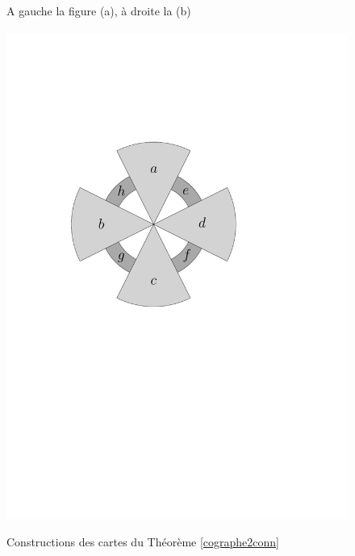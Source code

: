 \documentclass{scrartcl}
\begin{document}
\begin{flushleft}
\begin{figure}[h]
    \caption{Constructions des cartes du Théorème \ref{cographe2conn}}\label{cographemap}
    \begin{center}
        A gauche la figure (a), à droite la (b)
        \\~\\
        \includegraphics[page = \ipeFigpointabuse, scale = 0.4]{figs}
        \hspace*{1.5cm}

\end{center}
\end{figure}
\end{flushleft}
\end{document}
